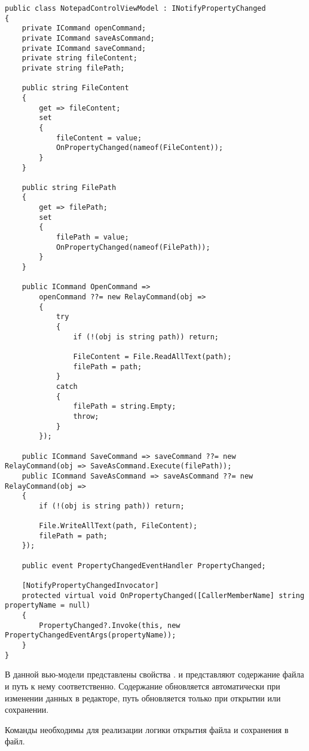 \documentclass[a4paper,14pt]{extarticle}
\begin{document}
\begin{lstlisting}
public class NotepadControlViewModel : INotifyPropertyChanged
{
    private ICommand openCommand;
    private ICommand saveAsCommand;
    private ICommand saveCommand;
    private string fileContent;
    private string filePath;

    public string FileContent
    {
        get => fileContent;
        set
        {
            fileContent = value;
            OnPropertyChanged(nameof(FileContent));
        }
    }

    public string FilePath
    {
        get => filePath;
        set
        {
            filePath = value;
            OnPropertyChanged(nameof(FilePath));
        }
    }

    public ICommand OpenCommand =>
        openCommand ??= new RelayCommand(obj =>
        {
            try
            {
                if (!(obj is string path)) return;

                FileContent = File.ReadAllText(path);
                filePath = path;
            }
            catch
            {
                filePath = string.Empty;
                throw;
            }
        });

    public ICommand SaveCommand => saveCommand ??= new RelayCommand(obj => SaveAsCommand.Execute(filePath));
    public ICommand SaveAsCommand => saveAsCommand ??= new RelayCommand(obj =>
    {
        if (!(obj is string path)) return;

        File.WriteAllText(path, FileContent);
        filePath = path;
    });

    public event PropertyChangedEventHandler PropertyChanged;

    [NotifyPropertyChangedInvocator]
    protected virtual void OnPropertyChanged([CallerMemberName] string propertyName = null)
    {
        PropertyChanged?.Invoke(this, new PropertyChangedEventArgs(propertyName));
    }
}
\end{lstlisting}

В данной вью-модели представлены свойства .  и  представляют содержание
файла и путь к нему соответственно. Содержание обновляется автоматически при изменении
данных в редакторе, путь обновляется только при открытии или сохранении.

Команды  необходимы для реализации логики
открытия файла и сохранения в файл.
\end{document}

